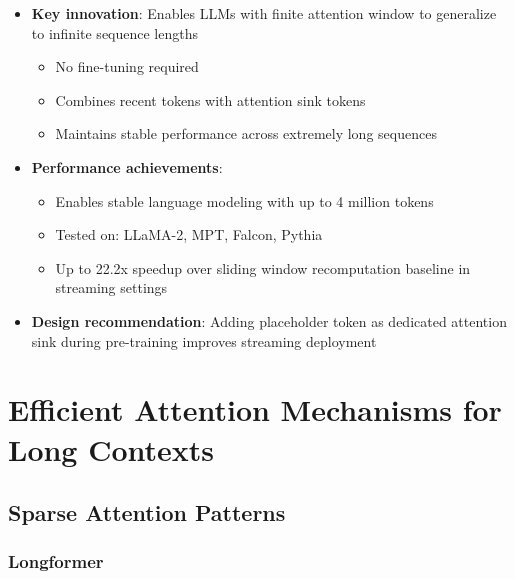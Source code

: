 \documentclass[11pt,letterpaper]{article}
\begin{document}
\begin{itemize}[leftmargin=*]
    \item \textbf{Key innovation}: Enables LLMs with finite attention window to generalize to infinite sequence lengths
    \begin{itemize}
        \item No fine-tuning required
        \item Combines recent tokens with attention sink tokens
        \item Maintains stable performance across extremely long sequences
    \end{itemize}

    \item \textbf{Performance achievements}:
    \begin{itemize}
        \item Enables stable language modeling with up to 4 million tokens
        \item Tested on: LLaMA-2, MPT, Falcon, Pythia
        \item Up to 22.2x speedup over sliding window recomputation baseline in streaming settings
    \end{itemize}

    \item \textbf{Design recommendation}: Adding placeholder token as dedicated attention sink during pre-training improves streaming deployment
\end{itemize}

\section{Efficient Attention Mechanisms for Long Contexts}

\subsection{Sparse Attention Patterns}

\subsubsection{Longformer}
\end{document}
